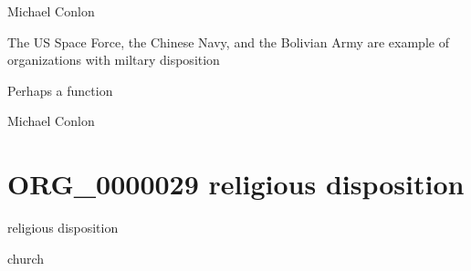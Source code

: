 \documentclass[letterpaper,10pt,english]{sphinxmanual}
\begin{document}
\begin{sphinxShadowBox}

\sphinxAtStartPar
Michael Conlon 
\end{sphinxShadowBox}

\begin{sphinxShadowBox}

\sphinxAtStartPar
The US Space Force, the Chinese Navy, and the Bolivian Army are example of organizations with miltary disposition
\end{sphinxShadowBox}

\begin{sphinxShadowBox}

\sphinxAtStartPar
Perhaps a function
\end{sphinxShadowBox}

\begin{sphinxShadowBox}

\sphinxAtStartPar
Michael Conlon 
\end{sphinxShadowBox}
\begin{quote}
\label{\detokenize{doc-ORG_0000029:org-0000029}}\label{\detokenize{doc-ORG_0000029:religious-disposition}}\label{\detokenize{doc-ORG_0000029:org-0000029}}
\ignorespaces \end{quote}


\section{ORG\_0000029 \sphinxhyphen{} religious disposition}
\label{\detokenize{doc-ORG_0000029:org-0000029-religious-disposition}}\label{\detokenize{doc-ORG_0000029:index-0}}\label{\detokenize{doc-ORG_0000029::doc}}
\begin{sphinxShadowBox}

\sphinxAtStartPar
religious disposition
\end{sphinxShadowBox}

\begin{sphinxShadowBox}

\sphinxAtStartPar
church
\end{sphinxShadowBox}
\end{document}
